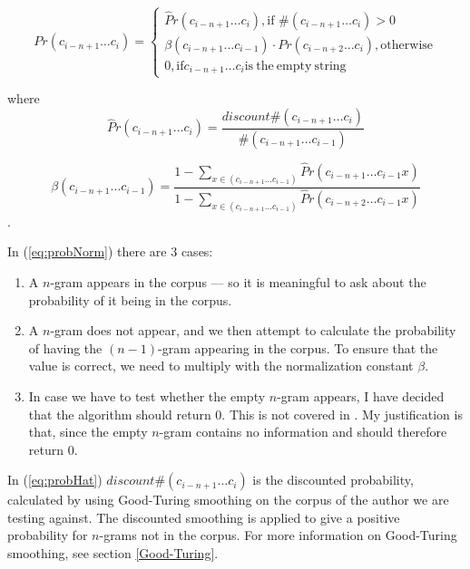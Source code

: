 \begin{equation}
\label{eq:probNorm}
Pr(c_{i - n + 1} \ldots c_{i}) = \left\{
\begin{array}{rl}
\hat{P}r(c_{i - n + 1} \ldots c_{i}), \text{if } \#(c_{i - n + 1} \ldots c_{i}) > 0\\
\beta(c_{i - n + 1} \ldots c_{i-1}) \cdot Pr(c_{i - n + 2} \ldots c_{i}), \mathrm{otherwise}\\
0, \mathrm{if} c_{i-n+1}\ldots c_i \mathrm{is\ the\ empty\ string}
\end{array} \right.
\end{equation}

where 
\begin{equation}
\label{eq:probHat}
\hat{P}r(c_{i - n + 1} \ldots c_{i}) = \frac{discount \#(c_{i - n + 1} \ldots c_{i})}{\#(c_{i - n + 1} \ldots c_{i-1})}
\end{equation}

\begin{equation}
\label{eq:beta}
\beta(c_{i - n + 1} \ldots c_{i-1}) = 
\frac
{1 - \sum_{x \in (c_{i - n + 1} \ldots c_{i-1})}\hat{P}r(c_{i - n + 1} \ldots c_{i-1} x)}
{1 - \sum_{x \in (c_{i - n + 1} \ldots c_{i-1})}\hat{P}r(c_{i - n + 2} \ldots c_{i-1} x)}
\end{equation}.

In (\ref{eq:probNorm}) there are 3 cases:
\begin{enumerate}
\item A $n$-gram appears in the corpus --- so it is meaningful to ask about the probability of it being in the corpus.
\item  A $n$-gram does not appear, and we then attempt to calculate the probability of having the $(n-1)$-gram appearing in the corpus. To ensure that the value is correct, we need to multiply with the normalization constant $\beta$. 
\item In case we have to test whether the empty $n$-gram appears, I have decided that the algorithm should return 0. This is not covered in \cite{nr4}. My justification is that, since the empty $n$-gram contains no information and should therefore return 0.
\end{enumerate}
In (\ref{eq:probHat}) $discount\#(c_{i - n + 1} \ldots c_{i})$ 
is the discounted probability, calculated by using Good-Turing smoothing on the corpus of the author we are testing against. The discounted smoothing is applied to give a positive probability for $n$-grams not in the corpus. For more information on Good-Turing smoothing, see section \ref{Good-Turing}.\\

